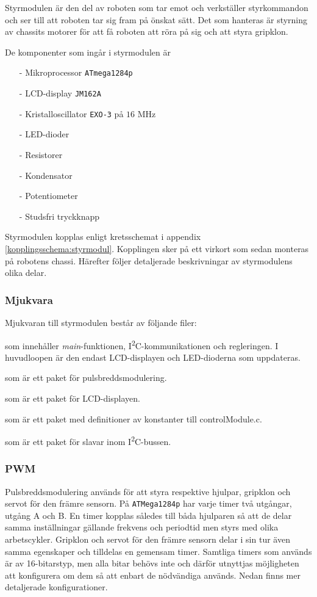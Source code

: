 \documentclass[11pt]{article}
\begin{document}
\begin{flushleft}
Styrmodulen är den del av roboten som tar emot och verkställer styrkommandon och ser till att roboten tar sig fram på önskat sätt. Det som hanteras är styrning av chassits motorer för att få roboten att röra på sig och att styra gripklon. 

De komponenter som ingår i styrmodulen är
\begin{itemize}
  \item[-] Mikroprocessor \verb+ATmega1284p+
  \item[-] LCD-display \verb+JM162A+
  \item[-] Kristalloscillator \verb+EXO-3+ på $16$ MHz
  \item[-] LED-dioder
  \item[-] Resistorer
  \item[-] Kondensator
  \item[-] Potentiometer
  \item[-] Studsfri tryckknapp
\end{itemize}

Styrmodulen kopplas enligt kretsschemat i appendix \ref{kopplingsschema:styrmodul}. Kopplingen sker på ett virkort som sedan monteras på robotens chassi. Härefter följer detaljerade beskrivningar av styrmodulens olika delar.

\subsubsection{Mjukvara}
Mjukvaran till styrmodulen består av följande filer:
\begin{description}[style=unboxed, leftmargin=0cm]
  \item[controlModule.c] som innehåller \textit{main}-funktionen, I\textsuperscript{2}C-kommunikationen och regleringen. I huvudloopen är den endast LCD-displayen och LED-dioderna som uppdateras.
  \item[PWM.h] som är ett paket för pulsbreddsmodulering.
  \item[LCD.h] som är ett paket för LCD-displayen.
  \item[constants.h] som är ett paket med definitioner av konstanter till controlModule.c.
  \item[I2C\_slave.h] som är ett paket för slavar inom I\textsuperscript{2}C-bussen.

\end{description}


\subsubsection{PWM}
Pulsbreddsmodulering används för att styra respektive hjulpar, gripklon och servot för den främre sensorn. På \verb+ATMega1284p+ har varje timer två utgångar, utgång A och B. En timer kopplas således till båda hjulparen så att de delar samma inställningar gällande frekvens och periodtid men styrs med olika arbetscykler. Gripklon och servot för den främre sensorn delar i sin tur även samma egenskaper och tilldelas en gemensam timer. Samtliga timers som används är av 16-bitarstyp, men alla bitar behövs inte och därför utnyttjas möjligheten att konfigurera om dem så att enbart de nödvändiga används. Nedan finns mer detaljerade konfigurationer. 


\end{flushleft}
\end{document}
